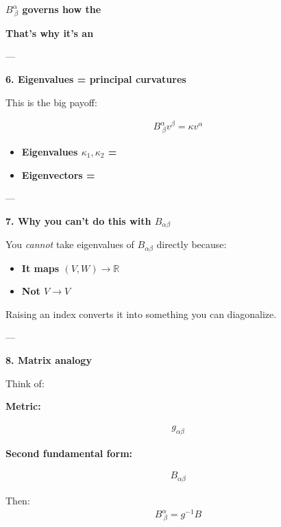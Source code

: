 \documentclass[12pt,a4paper]{report}
\begin{document}
\begin{description}
\begin{description}
\item \textbf{$B^\alpha_{\ \beta}$ governs how the }
\item \textbf{That’s why it’s an }

---

\item \textbf{6. Eigenvalues = principal curvatures}

This is the big payoff:

\begin{align*}
B^\alpha_{\ \beta} v^\beta = \kappa v^\alpha
\end{align*}

\begin{itemize}
\item \textbf{Eigenvalues $\kappa_1, \kappa_2$ = }
\item \textbf{Eigenvectors = }
\end{itemize}

---

\item \textbf{7. Why you can’t do this with $B_{\alpha\beta}$}

You \textit{cannot} take eigenvalues of $B_{\alpha\beta}$ directly because:

\begin{itemize}
\item \textbf{It maps $ (V,W) \to \mathbb{R} $}
\item \textbf{Not $ V \to V $}
\end{itemize}

Raising an index converts it into something you can diagonalize.

---

\item \textbf{8. Matrix analogy}

Think of:

\item \textbf{Metric:}

\begin{align*}
g_{\alpha\beta}
\end{align*}

\item \textbf{Second fundamental form:}

\begin{align*}
B_{\alpha\beta}
\end{align*}

Then:
\begin{align*}
B^\alpha_{\ \beta} = g^{-1} B
\end{align*}


\end{description}
\end{description}
\end{document}
